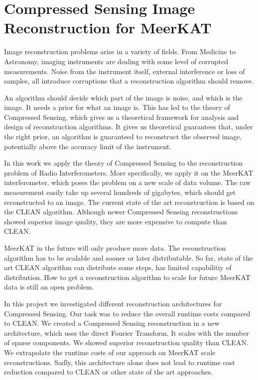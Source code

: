 \section{Compressed Sensing Image Reconstruction for MeerKAT} \label{intro}
Image reconstruction problems arise in a variety of fields. From Medicine to Astronomy, imaging instruments are dealing with some level of corrupted measurements. Noise from the instrument itself, external interference or loss of samples, all introduce corruptions that a reconstruction algorithm should remove. 

An algorithm should decide which part of the image is noise, and which is the image. It needs a prior for what an image is. This has led to the theory of Compressed Sensing\cite{candes2006robust, donoho2006compressed}, which gives us a theoretical framework for analysis and design of reconstruction algorithms. It gives us theoretical guarantees that, under the right prior, an algorithm is guaranteed to reconstruct the observed image, potentially  above the accuracy limit of the instrument.

In this work we apply the theory of Compressed Sensing to the reconstruction problem of Radio Interferometers. More specifically, we apply it on the MeerKAT interferometer, which poses the problem on a new scale of data volume. The raw measurement easily take up several hundreds of gigabytes, which should get reconstructed to an image. The current state of the art reconstruction is based on the CLEAN\cite{rich2008multi, rau2011multi} algorithm. Although newer Compressed Sensing reconstructions showed superior image quality\cite{girard2015sparse, dabbech2018cygnus}, they are more expensive to compute than CLEAN.

MeerKAT in the future will only produce more data. The reconstruction algorithm has to be scalable and sooner or later distributable. So far, state of the art CLEAN algorithm can distribute some steps, has limited capabilitiy of distribution. How to get a reconstruction algorithm to scale for future MeerKAT data is still an open problem.

In this project we investigated different reconstruction architectures for Compressed Sensing. Our task was to reduce the overall runtime costs compared to CLEAN. We created a Compressed Sensing reconstruction in a new architecture, which uses the direct Fourier Transform. It scales with the number of sparse components. We showed superior reconstruction quality than CLEAN.  We extrapolate the runtime costs of our approach on MeerKAT scale reconstructions. Sadly, this architecture alone does not lead to runtime cost reduction compared to CLEAN or other state of the art approaches.

